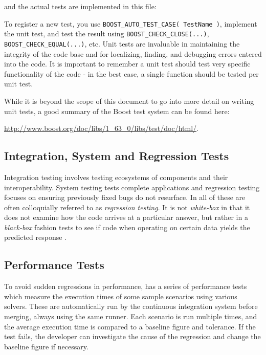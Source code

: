 
and the actual tests are implemented in this file:


To register a new test, you use \lstinline{BOOST_AUTO_TEST_CASE( TestName )},
implement the unit test, and test the result using
\lstinline{BOOST_CHECK_CLOSE(...)}, \lstinline{BOOST_CHECK_EQUAL(...)}, etc. Unit
tests are invaluable in maintaining the integrity of the code base and
for localizing, finding, and debugging errors entered into the code. It is
important to remember a unit test should test very specific
functionality of the code - in the best case, a single function should be
tested per unit test.

While it is beyond the scope of this document to go into more detail
on writing unit tests, a good summary of the Boost test system can be
found here:

\url{http://www.boost.org/doc/libs/1\_63\_0/libs/test/doc/html/}.


\subsection{Integration, System and Regression Tests}
Integration testing involves testing ecosystems of components and their interoperability. System testing tests complete applications and regression testing focuses on ensuring previously fixed bugs do not resurface. In {\nek} all of these are often colloquially referred to as {\em regression testing}. It is not \emph{white-box} in that it does not examine how the
code arrives at a particular answer, but rather in a \emph{black-box}
fashion tests to see if code when operating on certain data yields the
predicted response \cite{KFN-testing}.

\subsection{Performance Tests}
To avoid sudden regressions in performance, {\nek} has a series of performance tests which measure the execution times of some sample scenarios using various solvers. These are automatically run by the continuous integration system before merging, always using the same runner. Each scenario is run multiple times, and the average execution time is compared to a baseline figure and tolerance. If the test fails, the developer can investigate the cause of the regression and change the baseline figure if necessary.

